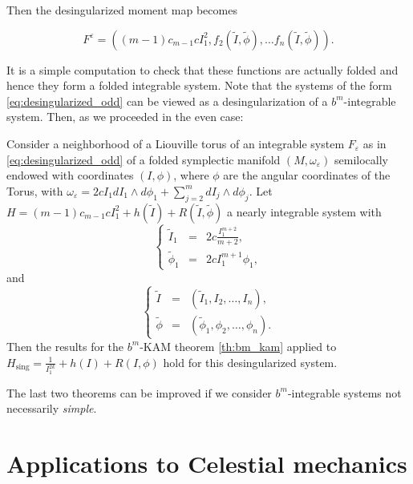 \begin{enumerate}
Then the desingularized moment map becomes

\begin{equation}\label{eq:desingularized_odd}
F^\varepsilon = ((m-1)c_{m-1}c I_1^2, f_2(\tilde I, \tilde \phi), \ldots f_n(\tilde I, \tilde \phi)).
\end{equation}

It is a simple computation to check that these functions are actually folded and hence they form a folded integrable system. Note that the systems of the form \ref{eq:desingularized_odd} can be viewed as a desingularization of a $b^m$-integrable system. Then, as we proceeded in the even case:

\begin{theoremE}
Consider a neighborhood of a Liouville torus of an integrable system $F_\varepsilon$ as in \ref{eq:desingularized_odd} of a folded symplectic manifold $(M, \omega_\varepsilon)$ semilocally endowed with coordinates $(I,\phi)$, where $\phi$ are the angular coordinates of the Torus, with $\omega_\varepsilon = 2cI_1 dI_1 \wedge d\phi_1 + \sum_{j=2}^m dI_j \wedge d\phi_j$.
Let $H = (m-1)c_{m-1} cI_1^2 + h(\tilde I) + R(\tilde I, \tilde \phi)$ a nearly integrable system with
$$
\left\{
\begin{array}{rcl}
\tilde I_1 & = &  2c\frac{I_1^{m+2}}{m+2},\\
\tilde \phi_1 & = &  2c I_1^{m+1} \phi_1 ,
\end{array}
\right.
$$
and
$$
\left\{
\begin{array}{rcl}
\tilde I & = & (\tilde I_1, I_2, \ldots, I_n),\\
\tilde \phi & = & (\tilde \phi_1, \phi_2, \ldots, \phi_n).
\end{array}
\right.
$$
Then the results for the $b^m$-KAM theorem \ref{th:bm_kam} applied to $H_{\text{sing}} = \frac{1}{I_1^{2k}} + h(I) + R(I,\phi)$ hold for this desingularized system.
\end{theoremE}

\begin{remark}
The last two theorems can be improved if we consider $b^m$-integrable systems not necessarily \emph{simple}.
\end{remark}



\end{enumerate}


\chapter{ Applications to Celestial mechanics}\label{ch:binvitation}

